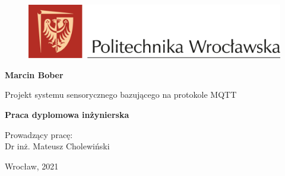 
\begin{titlepage}
  \begin{center}

    \begin{figure}[ht]
      \includegraphics[width=1\textwidth]{img/pwr.png}
    \end{figure}

    \vspace{4cm}
    \textbf{\huge Marcin Bober}
    \vspace{0.5cm}

    Projekt systemu sensorycznego bazującego na protokole MQTT
    \vspace{0.5cm}

    \textbf{\Large Praca dyplomowa inżynierska}
    

    \vspace{8cm}

    \begin{flushleft}
      Prowadzący pracę: \\
      Dr inż. Mateusz Cholewiński
    \end{flushleft}


    \vfill
    Wrocław, 2021
    

  \end{center}
\end{titlepage}